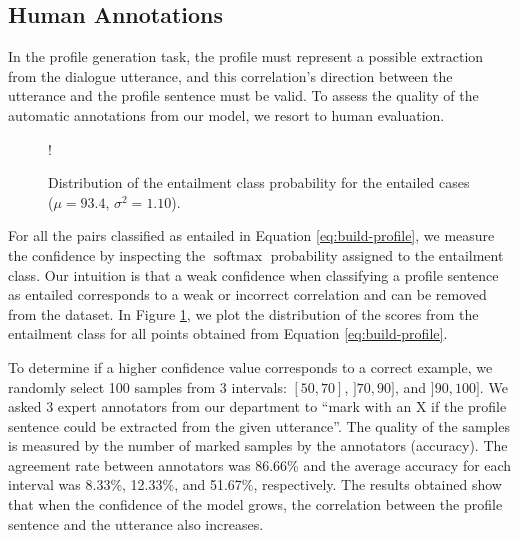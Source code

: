 \documentclass[11pt]{article}
\DeclareMathOperator*{\softmax}{softmax}
\begin{document}
\subsection{Human Annotations}


In the profile generation task, the profile must represent a possible extraction from the dialogue utterance, and this correlation's direction between the utterance and the profile sentence must be valid.
To assess the quality of the automatic annotations from our model, we resort to human evaluation.

\begin{figure}[h]
\centering
\resizebox {\columnwidth} {!} {
}
\vskip-0.2cm
\caption{Distribution of the entailment class probability for the entailed cases (\(\mu = 93.4\), \(\sigma^2 = 1.10\)).}
\label{fig:confidence-plot}
\end{figure}

For all the pairs classified as entailed in Equation \ref{eq:build-profile}, we measure the confidence by inspecting the \(\softmax\) probability assigned to the entailment class.
Our intuition is that a weak confidence when classifying a profile sentence as entailed corresponds to a weak or incorrect correlation and can be removed from the dataset.
In Figure \ref{fig:confidence-plot}, we plot the distribution of the scores from the entailment class for all points obtained from Equation \ref{eq:build-profile}.

To determine if a higher confidence value corresponds to a correct example, we randomly select 100 samples from 3 intervals: \([50, 70]\), \(]70, 90]\), and \(]90, 100]\).
We asked 3 expert annotators from our department to ``mark with an X if the profile sentence could be extracted from the given utterance''.
The quality of the samples is measured by the number of marked samples by the annotators (accuracy).
The agreement rate between annotators was 86.66\% and the average accuracy for each interval was 8.33\%, 12.33\%, and 51.67\%, respectively.
The results obtained show that when the confidence of the model grows, the correlation between the profile sentence and the utterance also increases.
\end{document}
